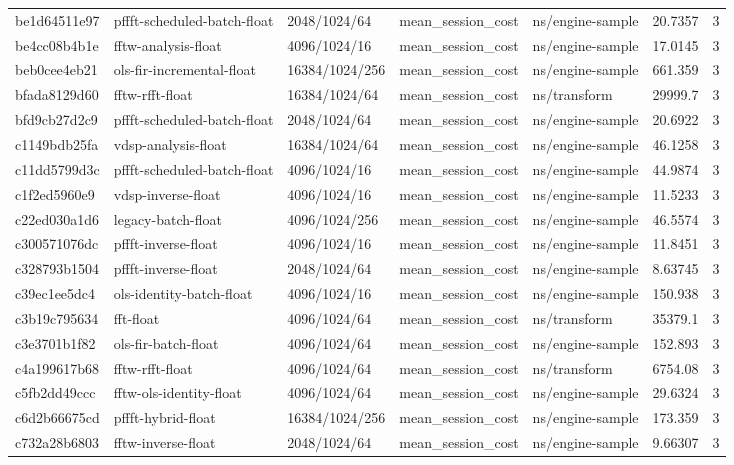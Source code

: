 \begin{longtable}{lllllrr}
be1d64511e97 & pffft-scheduled-batch-float & 2048/1024/64 & mean\_session\_cost & ns/engine-sample & 20.7357 & 3 \\
be4cc08b4b1e & fftw-analysis-float & 4096/1024/16 & mean\_session\_cost & ns/engine-sample & 17.0145 & 3 \\
beb0cee4eb21 & ols-fir-incremental-float & 16384/1024/256 & mean\_session\_cost & ns/engine-sample & 661.359 & 3 \\
bfada8129d60 & fftw-rfft-float & 16384/1024/64 & mean\_session\_cost & ns/transform & 29999.7 & 3 \\
bfd9cb27d2c9 & pffft-scheduled-batch-float & 2048/1024/64 & mean\_session\_cost & ns/engine-sample & 20.6922 & 3 \\
c1149bdb25fa & vdsp-analysis-float & 16384/1024/64 & mean\_session\_cost & ns/engine-sample & 46.1258 & 3 \\
c11dd5799d3c & pffft-scheduled-batch-float & 4096/1024/16 & mean\_session\_cost & ns/engine-sample & 44.9874 & 3 \\
c1f2ed5960e9 & vdsp-inverse-float & 4096/1024/16 & mean\_session\_cost & ns/engine-sample & 11.5233 & 3 \\
c22ed030a1d6 & legacy-batch-float & 4096/1024/256 & mean\_session\_cost & ns/engine-sample & 46.5574 & 3 \\
c300571076dc & pffft-inverse-float & 4096/1024/16 & mean\_session\_cost & ns/engine-sample & 11.8451 & 3 \\
c328793b1504 & pffft-inverse-float & 2048/1024/64 & mean\_session\_cost & ns/engine-sample & 8.63745 & 3 \\
c39ec1ee5dc4 & ols-identity-batch-float & 4096/1024/16 & mean\_session\_cost & ns/engine-sample & 150.938 & 3 \\
c3b19c795634 & fft-float & 4096/1024/64 & mean\_session\_cost & ns/transform & 35379.1 & 3 \\
c3e3701b1f82 & ols-fir-batch-float & 4096/1024/64 & mean\_session\_cost & ns/engine-sample & 152.893 & 3 \\
c4a199617b68 & fftw-rfft-float & 4096/1024/64 & mean\_session\_cost & ns/transform & 6754.08 & 3 \\
c5fb2dd49ccc & fftw-ols-identity-float & 4096/1024/64 & mean\_session\_cost & ns/engine-sample & 29.6324 & 3 \\
c6d2b66675cd & pffft-hybrid-float & 16384/1024/256 & mean\_session\_cost & ns/engine-sample & 173.359 & 3 \\
c732a28b6803 & fftw-inverse-float & 2048/1024/64 & mean\_session\_cost & ns/engine-sample & 9.66307 & 3 \\

\end{longtable}
